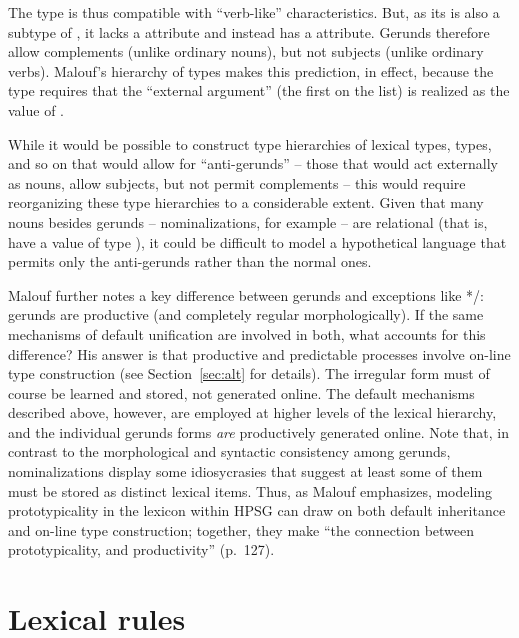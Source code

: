 \documentclass[output=paper
 	        ,biblatex
                ,babelshorthands
                ,newtxmath
                ,draftmode
                ,colorlinks, citecolor=brown
]{langscibook}
\begin{document}
The type  is thus compatible with ``verb-like'' characteristics.
But, as its  is also a subtype of , it lacks a  attribute and instead has a  attribute.
Gerunds therefore allow complements (unlike ordinary nouns), but not subjects (unlike ordinary verbs).
Malouf's hierarchy of types makes this prediction, in effect, because the  type requires that the ``external argument'' (the first on the  list) is realized as the value of .

While it would be possible to construct type hierarchies of lexical types,  types, and so on that would allow for ``anti-gerunds'' -- those that would act externally as nouns, allow subjects, but not permit complements -- this would require reorganizing these type hierarchies to a considerable extent.
Given that many nouns besides gerunds -- nominalizations, for example -- are relational (that is, have a  value of type ), it could be difficult to model a hypothetical language that permits only the anti-gerunds rather than the normal ones.

Malouf further notes a key difference between gerunds and exceptions like */:  gerunds are productive (and completely regular morphologically).
If the same mechanisms of default unification are involved in both, what accounts for this difference?
His answer is that productive and predictable processes involve on-line type construction (see Section~\ref{sec:alt} for details).
The irregular form  must of course be learned and stored, not generated online.
The default mechanisms described above, however, are employed at higher levels of the lexical hierarchy, and the individual gerunds forms \emph{are} productively generated online.
Note that, in contrast to the morphological and syntactic consistency among gerunds,  nominalizations display some idiosycrasies that suggest at least some of them must be stored as distinct lexical items.
Thus, as Malouf emphasizes, modeling prototypicality in the lexicon within HPSG can draw on both default inheritance and on-line type construction; together, they make ``the connection between prototypicality, and productivity'' (p.\ 127).

\section{Lexical rules}
\label{lexicon-sec-lexical-rules}
\end{document}
